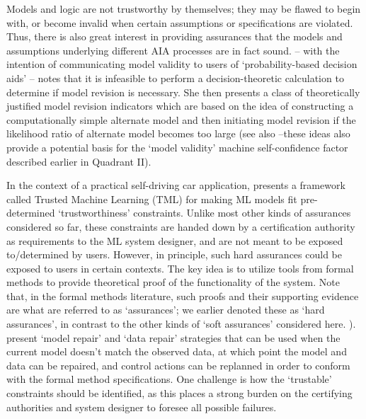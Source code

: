 Models and logic are not trustworthy by themselves; they may be flawed to begin with, or become invalid when certain assumptions or specifications are violated. Thus, there is also great interest in providing assurances that the models and assumptions underlying different AIA processes are in fact sound. \citet{Laskey1991-mf} -- with the intention of communicating model validity to users of `probability-based decision aids' -- notes that it is infeasible to perform a decision-theoretic calculation to determine if model revision is necessary. 
She then presents a class of theoretically justified model revision indicators which are based on the idea of constructing a computationally simple alternate model and then initiating model revision if the likelihood ratio of alternate model becomes too large (see also \citet{Zagorecki2015-qy,Habbema1976-xd} --these ideas also provide a potential basis for the `model validity' machine self-confidence factor described earlier in Quadrant II).

In the context of a practical self-driving car application, \citet{Ghosh2016-dl} presents a framework called Trusted Machine Learning (TML) for making ML models fit pre-determined `trustworthiness' constraints. 
Unlike most other kinds of assurances considered so far, these constraints are handed down by a certification authority as requirements to the ML system designer, and are not meant to be exposed to/determined by users. However, in principle, such hard assurances could be exposed to users in certain contexts. 
The key idea is to utilize tools from formal methods to provide theoretical proof of the functionality of the system. Note that, in the formal methods literature, such proofs and their supporting evidence are what are referred to as `assurances'; we earlier denoted these as `hard assurances', in contrast to the other kinds of `soft assurances' considered here. ). 
\citet{Ghosh2016-dl}  present `model repair' and `data repair' strategies that can be used when the current model doesn't match the observed data, at which point the model and data can be repaired, and control actions can be replanned in order to conform with the formal method specifications. One challenge is how the `trustable' constraints should be identified, as this places a strong burden on the certifying authorities and system designer to foresee all possible failures. %

